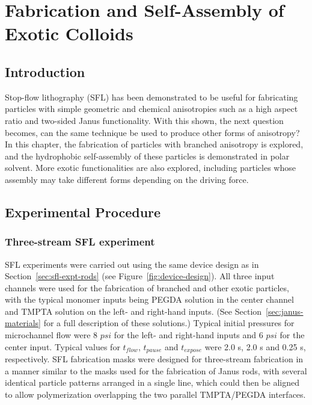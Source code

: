 \chapter{Fabrication and Self-Assembly of Exotic Colloids}
\label{ch:exotic}

\section{Introduction}

Stop-flow lithography (SFL) has been demonstrated to be useful for fabricating particles with 
simple geometric and chemical anisotropies such as a high aspect ratio and 
two-sided Janus functionality.
With this shown, the next question becomes, can the same technique be used to produce other forms of 
anisotropy?  In this chapter, the fabrication of particles with branched anisotropy is explored, and 
the hydrophobic self-assembly of these particles is demonstrated in polar solvent.  More exotic 
functionalities are also explored, including particles whose assembly may take different forms 
depending on the driving force.


\section{Experimental Procedure}
\label{sec:SFLx3}

\subsection{Three-stream SFL experiment}


SFL experiments were carried out using the same device design as in Section~\ref{sec:sfl-expt-rods} 
(see Figure~\ref{fig:device-design}).  All three input channels were used for the fabrication of 
branched and other exotic particles, with the typical monomer inputs being PEGDA solution in
the center channel and TMPTA solution on the left- and right-hand inputs. (See 
Section~\ref{sec:janus-materials} for a full description of these solutions.) 
Typical initial pressures for microchannel
flow were 8 $psi$ for the left- and right-hand inputs and 6 $psi$ for
the center input. Typical values for $t_{flow}$, $t_{pause}$ and $t_{expose}$ were 2.0 s, 2.0 s and 0.25 s, 
respectively.  SFL fabrication masks were designed for three-stream fabrication in a manner similar to 
the masks used for the fabrication of Janus rods, with several identical particle patterns arranged
in a single line, which could then be aligned to allow polymerization overlapping the 
two parallel TMPTA/PEGDA interfaces.

